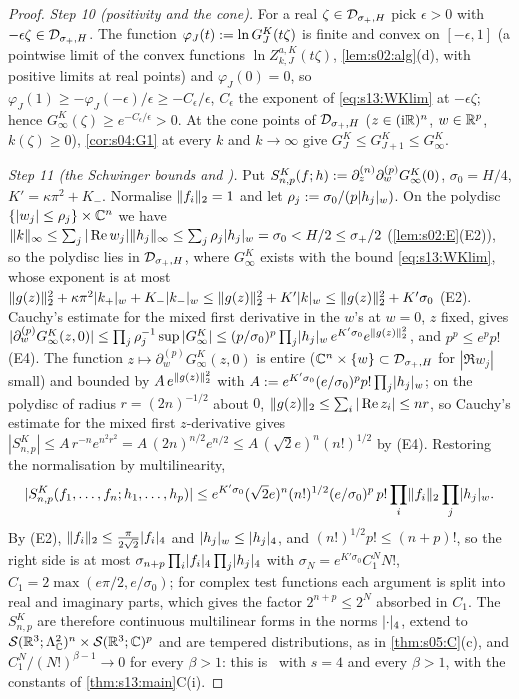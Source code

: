 \begin{proof}
\emph{Step 10 (positivity and the cone).} For a real $\zeta\in\mathcal D_{\sigma_+,H}$ pick $\epsilon>0$ with $-\epsilon\zeta\in\mathcal D_{\sigma_+,H}$. The function $\varphi_J(t):=\ln G^K_J(t\zeta)$ is finite and convex on $[-\epsilon,1]$ (a pointwise limit of the convex functions $\ln Z^{a,K}_{k,J}(t\zeta)$, \cref{lem:s02:alg}(d), with positive limits at real points) and $\varphi_J(0)=0$, so $\varphi_J(1)\ge-\varphi_J(-\epsilon)/\epsilon\ge-C_\epsilon/\epsilon$, $C_\epsilon$ the exponent of \eqref{eq:s13:WKlim} at $-\epsilon\zeta$; hence $G^K_\infty(\zeta)\ge e^{-C_\epsilon/\epsilon}>0$. At the cone points of $\mathcal D_{\sigma_+,H}$ ($z\in(\mathrm i\mathbb R)^n$, $w\in\mathbb R^p$, $k(\zeta)\ge0$), \cref{cor:s04:G1} at every $k$ and $k\to\infty$ give $G^K_J\le G^K_{J+1}\le G^K_\infty$.

\emph{Step 11 (the Schwinger bounds and \Ezz).} Put $S^K_{n,p}(f;h):=\partial^{(n)}_z\partial^{(p)}_wG^K_\infty(0)$, $\sigma_0=H/4$, $K'=\kappa\pi^2+K_-$. Normalise $\lVert f_i\rVert_2=1$ and let $\rho_j:=\sigma_0/(p\lvert h_j\rvert_{w})$. On the polydisc $\{|w_j|\le\rho_j\}\times\mathbb C^n$ we have $\lVert k\rVert_\infty\le\sum_j|\operatorname{Re} w_j|\lVert h_j\rVert_\infty\le\sum_j\rho_j\lvert h_j\rvert_{w}=\sigma_0<H/2\le\sigma_+/2$ (\cref{lem:s02:E}(E2)), so the polydisc lies in $\mathcal D_{\sigma_+,H}$, where $G^K_\infty$ exists with the bound \eqref{eq:s13:WKlim}, whose exponent is at most $\lVert g(z)\rVert_2^2+\kappa\pi^2\lvert k_+\rvert_{w}+K_-\lvert k_-\rvert_{w}\le\lVert g(z)\rVert_2^2+K'\lvert k\rvert_{w}\le\lVert g(z)\rVert_2^2+K'\sigma_0$ (E2). Cauchy's estimate for the mixed first derivative in the $w$'s at $w=0$, $z$ fixed, gives $|\partial^{(p)}_wG^K_\infty(z,0)|\le\prod_j\rho_j^{-1}\sup|G^K_\infty|\le(p/\sigma_0)^p\prod_j\lvert h_j\rvert_{w}\,e^{K'\sigma_0}e^{\lVert g(z)\rVert_2^2}$, and $p^p\le e^pp!$ (E4). The function $z\mapsto\partial^{(p)}_wG^K_\infty(z,0)$ is entire ($\mathbb C^n\times\{w\}\subset\mathcal D_{\sigma_+,H}$ for $|\Re w_j|$ small) and bounded by $A\,e^{\lVert g(z)\rVert_2^2}$ with $A:= e^{K'\sigma_0}(e/\sigma_0)^pp!\prod_j\lvert h_j\rvert_{w}$; on the polydisc of radius $r=(2n)^{-1/2}$ about $0$, $\lVert g(z)\rVert_2\le\sum_i|\operatorname{Re} z_i|\le nr$, so Cauchy's estimate for the mixed first $z$-derivative gives $|S^K_{n,p}|\le A\,r^{-n}e^{n^2r^2}=A\,(2n)^{n/2}e^{n/2}\le A\,(\sqrt2e)^n(n!)^{1/2}$ by (E4). Restoring the normalisation by multilinearity,
\[
|S^K_{n,p}(f_1,\dots,f_n;h_1,\dots,h_p)|\le e^{K'\sigma_0}(\sqrt2e)^n(n!)^{1/2}(e/\sigma_0)^p\,p!\prod_i\lVert f_i\rVert_2\prod_j\lvert h_j\rvert_{w}.
\]
By (E2), $\lVert f_i\rVert_2\le\frac\pi{2\sqrt2}\lvert f_i\rvert_{4}$ and $\lvert h_j\rvert_{w}\le\lvert h_j\rvert_{4}$, and $(n!)^{1/2}p!\le(n+p)!$, so the right side is at most $\sigma_{n+p}\prod_i\lvert f_i\rvert_{4}\prod_j\lvert h_j\rvert_{4}$ with $\sigma_N=e^{K'\sigma_0}C_1^NN!$, $C_1=2\max(e\pi/2,e/\sigma_0)$; for complex test functions each argument is split into real and imaginary parts, which gives the factor $2^{n+p}\le2^N$ absorbed in $C_1$. The $S^K_{n,p}$ are therefore continuous multilinear forms in the norms $\lvert \cdot\rvert_{4}$, extend to $\mathcal S(\mathbb R^3;\Lambda^2_{\mathbb C})^n\times\mathcal S(\mathbb R^3;\mathbb C)^p$ and are tempered distributions, as in \cref{thm:s05:C}(c), and $C_1^N/(N!)^{\beta-1}\to0$ for every $\beta>1$: this is \Ezz\ with $s=4$ and every $\beta>1$, with the constants of \cref{thm:s13:main}C(i).
\end{proof}

